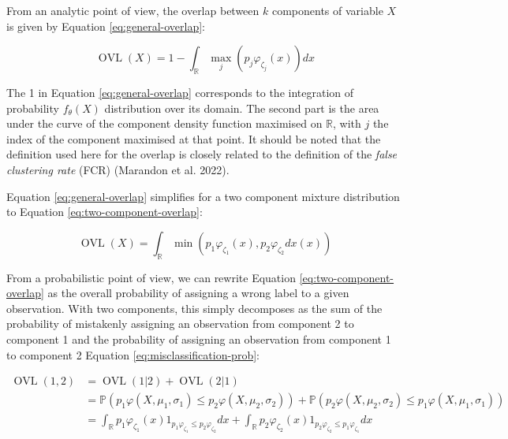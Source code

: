 From an analytic point of view, the overlap between \(k\) components of
variable \(X\) is given by Equation \eqref{eq:general-overlap}:

\begin{equation}
    \operatorname{OVL} (X)= 1 - \int_{\mathbb{R}} \max_j (p_j \varphi_{\zeta_j} (x)) dx
\label{eq:general-overlap}
\end{equation}

The 1 in Equation \eqref{eq:general-overlap} corresponds to the
integration of probability \(f_{\theta}(X)\) distribution over its domain.
The second part is the area under the curve of the component density
function maximised on \(\mathbb{R}\), with \(j\) the index of the component
maximised at that point. It should be noted that the definition used here for the overlap is closely related to the definition of the \emph{false clustering rate} (FCR) (Marandon et al. 2022).

Equation \eqref{eq:general-overlap} simplifies for a two component
mixture distribution to Equation \eqref{eq:two-component-overlap}:

\begin{equation}
    \operatorname{OVL} (X)= \int_{\mathbb{R}} \min \left(p_1 \varphi_{\zeta_1} (x), p_2 \varphi_{\zeta_2} dx (x)\right)
\label{eq:two-component-overlap}
\end{equation}

From a probabilistic point of view, we can rewrite Equation
\eqref{eq:two-component-overlap} as the overall probability of assigning
a wrong label to a given observation. With two components, this simply
decomposes as the sum of the probability of mistakenly assigning an
observation from component 2 to component 1 and the probability of
assigning an observation from component 1 to component 2 Equation
\eqref{eq:misclassification-prob}:

\begin{equation}
\begin{split}
\operatorname{OVL} (1, 2) & = \operatorname{OVL} (1 | 2) + \operatorname{OVL} (2 | 1) \\
& = \mathbb{P}\left(p_1 \varphi (X, \mu_1, \sigma_1) \le p_2 \varphi (X, \mu_2, \sigma_2) \right) + \mathbb{P}\left(p_2 \varphi (X, \mu_2, \sigma_2) \le p_1 \varphi (X, \mu_1, \sigma_1)\right) \\
& = \int_{\mathbb{R}} p_1 \varphi_{\zeta_1} (x) \mathrm{1}_{p_1 \varphi_{\zeta_1}  \le p_2 \varphi_{\zeta_2}} dx + \int_{\mathbb{R}} p_2 \varphi_{\zeta_2} (x) \mathrm{1}_{p_2 \varphi_{\zeta_2} \le p_1 \varphi_{\zeta_1}} dx
\end{split}
\label{eq:misclassification-prob}
\end{equation}

